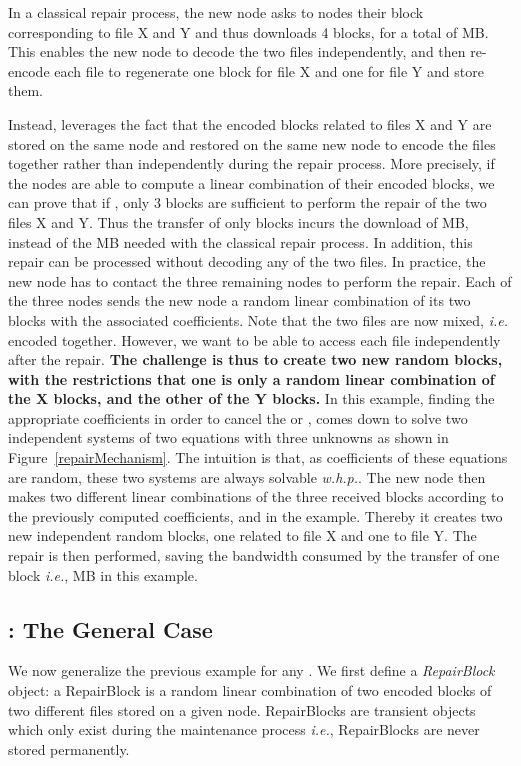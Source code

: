 In a classical repair process, the new node asks to  nodes their block corresponding to file X and Y and thus downloads 4 blocks, for a total of  MB. This enables the new node to  decode the two files independently, and then re-encode each file to regenerate one block for file X and one for file Y and store them.  

Instead, \crc  leverages the fact that the encoded blocks related to files X and Y are stored on the same node and restored on the same new node to encode the files together rather than independently during the repair process. More precisely, if the nodes are able to compute a linear combination of their encoded blocks, we can prove that if , only 3 blocks are sufficient to perform the repair of the two files X and Y. Thus the transfer of only  blocks incurs the download of  MB, instead of the  MB needed with the classical repair process.  In addition, this repair can be processed without decoding any of the two files. In practice, the new node has to contact the three remaining nodes to perform the repair. Each of the three nodes sends the new node a random linear combination of its two blocks with the associated coefficients. Note that the two files are now mixed, \textit{i.e.} encoded together. However, we want to be able to access each file independently after the repair. \textbf{The challenge is thus to create two new random blocks, with the restrictions that one is only a random linear combination of the X blocks, and the other of the Y blocks.}
In this example, finding the appropriate coefficients in order to cancel the  or ,  comes down to solve two independent systems of two equations with three unknowns as shown in Figure~\ref{repairMechanism}. The intuition is that, as coefficients of these equations are random, these two systems are always solvable \textit{w.h.p.}. The new node then makes two different linear combinations of the three received blocks according to the previously computed coefficients,  and  in the example. Thereby it creates two new independent random blocks, one related to file X and one to file Y. The repair is then performed, saving the bandwidth consumed by the transfer of one block \emph{i.e.},  MB in this example. 

\subsection{\crc: The General Case}
\label{generalCase}



We now generalize the previous example for any . We first define a \textit{RepairBlock} object: a RepairBlock is a random linear combination of two encoded blocks of two different files stored on a given node. RepairBlocks are transient objects which only exist during the maintenance process \emph{i.e.}, RepairBlocks are never stored permanently.

